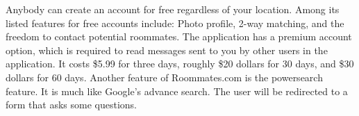 \documentclass[journal]{./IEEE/IEEEtran}
\begin{document}
Anybody can create an account for free regardless of your location. Among its listed features for free accounts include: Photo profile, 2-way matching, and the freedom to contact potential roommates. The application has a premium account option, which is required to read messages sent to you by other users in the application. It costs \$5.99 for three days, roughly \$20 dollars for 30 days, and \$30 dollars for 60 days.
Another feature of Roommates.com is the powersearch feature. It is much like Google's advance search. The user will be redirected to a form that asks some questions.
\end{document}
